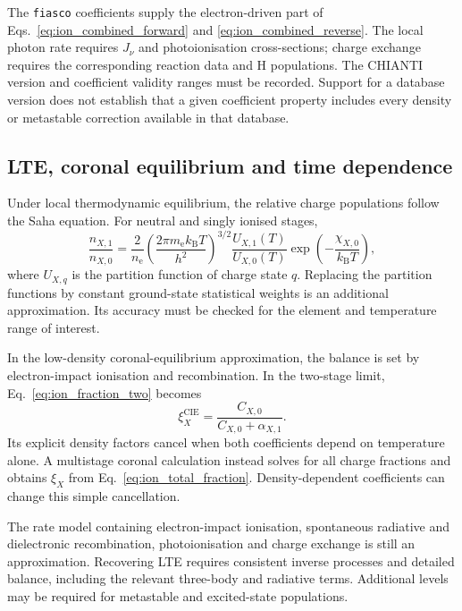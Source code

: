 The \texttt{fiasco} coefficients supply the electron-driven part of
Eqs.~\eqref{eq:ion_combined_forward} and \eqref{eq:ion_combined_reverse}.
The local photon rate requires \(J_\nu\) and photoionisation cross-sections;
charge exchange requires the corresponding reaction data and H populations.
The CHIANTI version and coefficient validity ranges must be recorded.
Support for a database version does not establish that a given coefficient
property includes every density or metastable correction available in that
database.

\subsection{LTE, coronal equilibrium and time dependence}
\label{subsec:ion_equilibrium_limits}

Under local thermodynamic equilibrium, the relative charge populations follow
the Saha equation. For neutral and singly ionised stages,
\begin{equation}
 \frac{n_{X,1}}{n_{X,0}}
 =\frac{2}{n_{\mathrm e}}
 \left(\frac{2\pi m_{\mathrm e}k_{\mathrm B}T}{h^2}\right)^{3/2}
 \frac{U_{X,1}(T)}{U_{X,0}(T)}
 \exp\left(-\frac{\chi_{X,0}}{k_{\mathrm B}T}\right),
 \label{eq:ion_saha}
\end{equation}
where \(U_{X,q}\) is the partition function of charge state \(q\).
Replacing the partition functions by constant ground-state statistical weights
is an additional approximation. Its accuracy must be checked for the element
and temperature range of interest.

In the low-density coronal-equilibrium approximation, the balance is set by
electron-impact ionisation and recombination. In the two-stage limit,
Eq.~\eqref{eq:ion_fraction_two} becomes
\begin{equation}
 \xi_X^{\mathrm{CIE}}
 =\frac{C_{X,0}}{C_{X,0}+\alpha_{X,1}}.
 \label{eq:ion_cie_two}
\end{equation}
Its explicit density factors cancel when both coefficients depend on
temperature alone. A multistage coronal calculation instead solves for all
charge fractions and obtains \(\xi_X\) from Eq.~\eqref{eq:ion_total_fraction}.
Density-dependent coefficients can change this simple cancellation.

The rate model containing electron-impact ionisation, spontaneous radiative
and dielectronic recombination, photoionisation and charge exchange is still
an approximation. Recovering LTE requires consistent inverse processes and
detailed balance, including the relevant three-body and radiative terms.
Additional levels may be required for metastable and excited-state populations.

